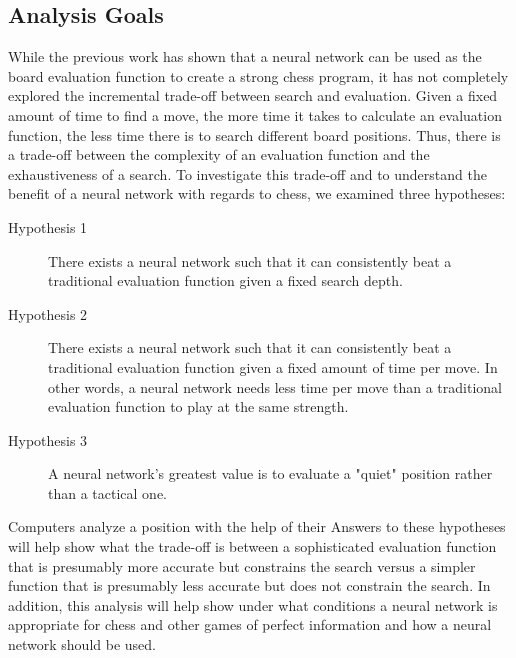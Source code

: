 \documentclass[12pt]{article}
\begin{document}
\subsection{Analysis Goals}
While the previous work has shown that a neural network can be used as the board evaluation function to create a strong chess program, it has not completely explored the incremental trade-off between search and evaluation. Given a fixed amount of time to find a move, the more time it takes to calculate an evaluation function, the less time there is to search different board positions. Thus, there is a trade-off between the complexity of an evaluation function and the exhaustiveness of a search. To investigate this trade-off and to understand the benefit of a neural network with regards to chess, we examined three hypotheses:
\begin{description}
	\item[Hypothesis 1] There exists a neural network such that it can consistently beat a traditional evaluation function given a fixed search depth.
	\item[Hypothesis 2] There exists a neural network such that it can consistently beat a traditional evaluation function given a fixed amount of time per move. In other words, a neural network needs less time per move than a traditional evaluation function to play at the same strength.
	\item[Hypothesis 3] A neural network's greatest value is to evaluate a "quiet" position rather than a tactical one.
\end{description} 

Computers analyze a position with the help of their
Answers to these hypotheses will help show what the trade-off is between a sophisticated evaluation function that is presumably more accurate but constrains the search versus a simpler function that is presumably less accurate but does not constrain the search. In addition, this analysis will help show under what conditions a neural network is appropriate for chess and other games of perfect information and how a neural network should be used.
\end{document}
